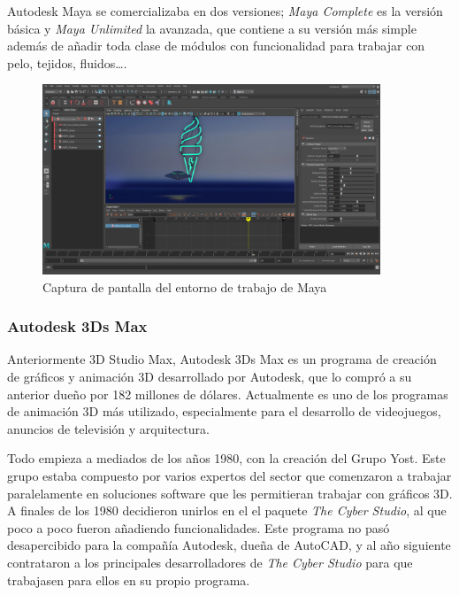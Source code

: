Autodesk Maya se comercializaba en dos versiones; \textit{Maya Complete} es la versión básica y \textit{Maya Unlimited} la avanzada, que contiene a su versión más simple además de añadir toda clase de módulos con funcionalidad para trabajar con pelo, tejidos, fluidos\dots{}.

\begin{figure}[!h]
\begin{center}
\includegraphics[width=0.9\textwidth]{imagenes/2/maya.jpg}
\caption{Captura de pantalla del entorno de trabajo de Maya}
\label{fig:maya}
\end{center}
\end{figure}

\subsubsection{Autodesk 3Ds Max}

Anteriormente 3D Studio Max, Autodesk 3Ds Max es un programa de creación de gráficos y animación 3D desarrollado por Autodesk, que lo compró a su anterior dueño por 182 millones de dólares. Actualmente es uno de los programas de animación 3D más utilizado, especialmente para el desarrollo de videojuegos, anuncios de televisión y arquitectura.

Todo empieza a mediados de los años 1980, con la creación del Grupo Yost. Este grupo estaba compuesto por varios expertos del sector que comenzaron a trabajar paralelamente en soluciones software que les permitieran trabajar con gráficos 3D. A finales de los 1980 decidieron unirlos en el el paquete \textit{The Cyber Studio}, al que poco a poco fueron añadiendo funcionalidades. Este programa no pasó desapercibido para la compañía Autodesk, dueña de AutoCAD, y al año siguiente contrataron a los principales desarrolladores de \textit{The Cyber Studio} para que trabajasen para ellos en su propio programa.

